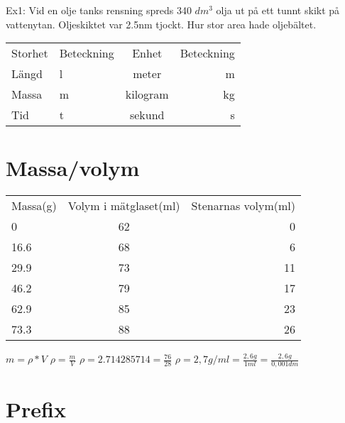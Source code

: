 \documentclass[a4paper,11pt]{article}
\begin{document}
\begin{flushleft}
Ex1: Vid en olje tanks rensning spreds 340 $ dm^3 $ olja ut på ett tunnt skikt på vattenytan.
Oljeskiktet var 2.5nm tjockt.\newline
Hur stor area hade oljebältet.
\newline
\begin{tabular}{l l | c r}
  Storhet & Beteckning & Enhet & Beteckning\\
  Längd & l & meter & m\\
  Massa & m & kilogram & kg\\
  Tid & t & sekund & s\\
\end{tabular}
\newpage
\section{Massa/volym}

\begin{tabular}{l c r}
  Massa(g) & Volym i mätglaset(ml) & Stenarnas volym(ml)\\
  0 & 62 & 0\\
  16.6 & 68 & 6\\
  29.9 & 73 & 11\\
  46.2 & 79 & 17\\
  62.9 & 85 & 23\\
  73.3 & 88 & 26\\
\end{tabular}
\newline
\newline
$ m = \rho * V  $
\newline
$ \rho = \frac{m}{V} $
\newline
$ \rho = 2.714285714 = \frac{76}{28} $\newline
$ \rho = 2,7 g/ml = \frac{2,6 g}{1 ml} = \frac{2,6 g}{0,001 dm} $
\newpage
\section{Prefix}


\end{flushleft}
\end{document}
